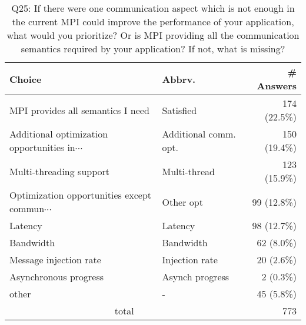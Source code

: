 \begin{table}[htb]%
\begin{center}%
\caption{Q25: If there were one communication aspect which is not enough in the current MPI could improve the performance of your application, what would you prioritize? Or is MPI providing all the communication semantics required by your application? If not, what is missing?}%
\label{tab:Q25-ans}%
\begin{tabular}{l|l|r}%
\hline%
Choice & Abbrv. & \# Answers \\%
\hline%
MPI provides all semantics I need & Satisfied & 174 (22.5\%) \\%
{\small Additional optimization opportunities in$\cdots$} & Additional comm. opt. & 150 (19.4\%) \\%
Multi-threading support & Multi-thread & 123 (15.9\%) \\%
{\small Optimization opportunities except commun$\cdots$} & Other opt & 99 (12.8\%) \\%
Latency & Latency & 98 (12.7\%) \\%
Bandwidth & Bandwidth & 62 (8.0\%) \\%
Message injection rate & Injection rate & 20 (2.6\%) \\%
Asynchronous progress & Asynch progress & 2 (0.3\%) \\%
other & - & 45 (5.8\%) \\%
\hline%
\multicolumn{2}{c}{total} & 773 \\%
\hline%
\end{tabular}%
\end{center}%
\end{table}%
